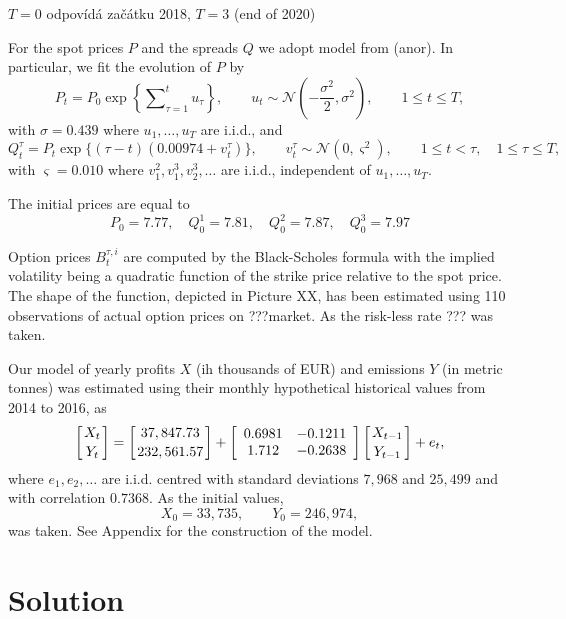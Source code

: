 \documentclass[3p,times]{elsarticle}
\begin{document}
$T=0$ odpovídá začátku 2018, $T=3$ (end of 2020)

For the spot prices $P$ and the spreads $Q$ we adopt model from (anor). In particular, we fit the evolution of $P$ by 
\[
P_{t}=P_{0}\exp\left\{ \sum\nolimits_{\tau=1}^t u_{\tau} \right\},
\qquad u_t \sim \mathcal{N}\left(
-\frac{\sigma^2}{2},\sigma^2
\right),\qquad 1\leq t \leq T, 
\]
with $\sigma=0.439$ where $u_{1},\dots,u_T$ are i.i.d., and
\[
Q^\tau_{t}=P_t\exp\{(\tau-t)(0.00974+v^\tau_{t})\},\qquad v^\tau_{t}\sim \mathcal{N}(0,\varsigma^2),\qquad 1\leq t< \tau,\quad 1\leq \tau \leq T,
	\]
with $\varsigma=0.010$ where $v^2_1,v_1^3,v_2^3,\dots$ are i.i.d., independent of $u_1,\dots,u_T$.

The initial prices are equal to 
$$P_0=7.77, \quad Q^1_0=7.81,\quad Q^2_0=7.87,\quad Q^3_0=7.97$$ %

Option prices $B^{\tau,i}_t$ are computed by the Black-Scholes formula with the implied volatility being a quadratic function of the strike price relative to the spot price. The shape of the function, depicted in Picture XX, has been estimated using 110 observations of actual option prices on ???market. As the risk-less rate ??? was taken. 


Our model of yearly profits $X$ (ih thousands of EUR) and emissions $Y$ (in metric tonnes) was estimated using their monthly hypothetical historical values from 2014 to 2016, as 
\begin{equation}
\left[X_t
\atop
Y_t
\right]
=\left[37,847.73
\atop
232,561.57
\right]+
\left[
\begin{array}{cc}
0.6981 & -0.1211 \\
1.712 & -0.2638
\end{array}
\right]
\left[X_{t-1}
\atop
Y_{t-1}
\right]
 + e_t,
\end{equation}
where $e_1,e_2,\dots$ are i.i.d. centred with standard deviations $7,968$ and $25,499$ and with correlation $0.7368$. As the initial values,
$$
X_0 = 33,735,\qquad Y_0 = 246,974,
$$
was taken.  See Appendix for the construction of the model. 


		
\section{Solution}
\end{document}
